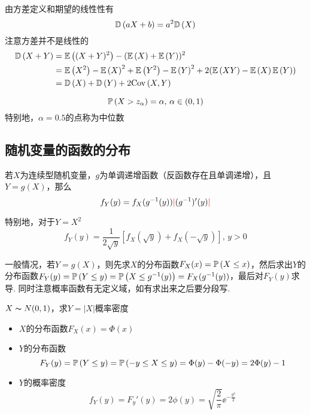 由方差定义和期望的线性性有
\[\mathbb{D}\left(aX+b\right)=a^2\mathbb{D}\left(X\right)\]
注意方差并不是线性的
\[\begin{aligned}
\mathbb{D}\left(X+Y\right)&=\mathbb{E}\left((X+Y)^2\right)-(\mathbb{E}\left(X\right)+\mathbb{E}\left(Y\right))^2\\
&=\mathbb{E}\left(X^2\right)-\mathbb{E}\left(X\right)^2+\mathbb{E}\left(Y^2\right)-\mathbb{E}\left(Y\right)^2+2(\mathbb{E}\left(XY\right)-\mathbb{E}\left(X\right)\mathbb{E}\left(Y\right))\\
&=\mathbb{D}\left(X\right)+\mathbb{D}\left(Y\right)+2\mathrm{Cov}\left(X,Y\right)
\end{aligned}\]
\begin{definition}
\[\mathbb{P}\left(X>z_\alpha\right)=\alpha,\,\alpha\in(0,1)\]
特别地，$\alpha=0.5$的点称为中位数
\end{definition}

\subsection{随机变量的函数的分布}
\begin{theorem}
若$X$为连续型随机变量，$g$为单调递增函数（反函数存在且单调递增），且$Y=g(X)$，那么
\[f_Y(y)=f_X(g^{-1}(y))\textcolor{red}{|}(g^{-1})'(y)\textcolor{red}{|}\]
\end{theorem}
特别地，对于$Y=X^2$
\[f_Y(y)=\frac{1}{2\sqrt{y}}[f_X(\sqrt{y})+f_X(-\sqrt{y})],\,y>0\]

一般情况，若$Y=g(X)$，则先求$X$的分布函数$F_X(x)=\mathbb{P}\left(X\leq x\right)$，然后求出$Y$的分布函数$F_Y(y)=\mathbb{P}\left(Y\leq y\right)=\mathbb{P}\left(X\leq g^{-1}(y)\right)=F_X(g^{-1}(y))$，最后对$F_Y(y)$求导.
同时注意概率函数有无定义域，如有求出来之后要分段写.
\begin{example}
$X\thicksim N(0,1)$，求$Y=|X|$概率密度
\end{example}
\begin{analysis}
\begin{itemize}
	\item $X$的分布函数$F_X(x)=\Phi(x)$
	\item $Y$的分布函数
	\[F_Y(y)=\mathbb{P}\left(Y\leq y\right)=\mathbb{P}\left(-y\leq X\leq y\right)=\Phi(y)-\Phi(-y)=2\Phi(y)-1\]
	\item $Y$的概率密度
	\[f_Y(y)=F_y'(y)=2\phi(y)=\sqrt{\frac{2}{\pi}}\ee^{-\frac{y^2}{2}}\]
\end{itemize}
\end{analysis}

